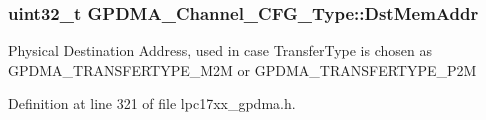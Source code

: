 \hypertarget{struct_g_p_d_m_a___channel___c_f_g___type_a1423fbb915f781a0ce6969252ed146cd}{
\subsubsection[{\-Dst\-Mem\-Addr}]{\setlength{\rightskip}{0pt plus 5cm}uint32\-\_\-t {\bf \-G\-P\-D\-M\-A\-\_\-\-Channel\-\_\-\-C\-F\-G\-\_\-\-Type\-::\-Dst\-Mem\-Addr}}}\label{struct_g_p_d_m_a___channel___c_f_g___type_a1423fbb915f781a0ce6969252ed146cd}
\-Physical \-Destination \-Address, used in case \-Transfer\-Type is chosen as \-G\-P\-D\-M\-A\-\_\-\-T\-R\-A\-N\-S\-F\-E\-R\-T\-Y\-P\-E\-\_\-\-M2\-M or \-G\-P\-D\-M\-A\-\_\-\-T\-R\-A\-N\-S\-F\-E\-R\-T\-Y\-P\-E\-\_\-\-P2\-M 

\-Definition at line 321 of file lpc17xx\-\_\-gpdma.\-h.


